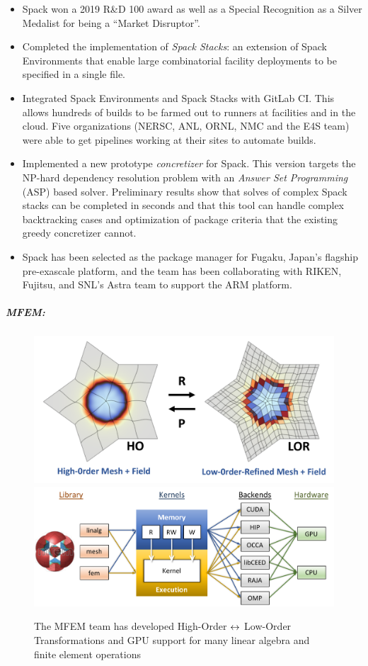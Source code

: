\begin{itemize}
\item Spack won a 2019 R\&D 100 award as well as a Special Recognition
      as a Silver Medalist for being a ``Market Disruptor''.

\item Completed the implementation of {\it Spack Stacks}: an extension of Spack
      Environments that enable large combinatorial facility deployments to
      be specified in a single file.

\item Integrated Spack Environments and Spack Stacks with GitLab CI.  This
      allows hundreds of builds to be farmed out to runners at facilities and
      in the cloud.  Five organizations (NERSC, ANL, ORNL, NMC and the E4S team)
      were able to get pipelines working at their sites to automate builds.

\item Implemented a new prototype {\it concretizer} for Spack.  This version
      targets the NP-hard dependency resolution problem with an {\it
      Answer Set Programming} (ASP) based solver.  Preliminary results
      show that solves of complex Spack stacks can be completed in
      seconds and that this tool can handle complex backtracking cases
      and optimization of package criteria that the existing greedy
      concretizer cannot.

\item Spack has been selected as the package manager for Fugaku, Japan's
      flagship pre-exascale platform, and the team has been collaborating
      with RIKEN, Fujitsu, and SNL's Astra team to support the ARM
      platform.
\end{itemize}

\subparagraph{MFEM:}

\begin{figure}[tb]
\centering
\includegraphics[width=.4\textwidth]{projects/2.3.6-NNSA/2.3.6.02-LLNL-ATDM/HO-LO}
\includegraphics[width=.4\textwidth]{projects/2.3.6-NNSA/2.3.6.02-LLNL-ATDM/mfem-gpu}
\caption{The MFEM team has developed High-Order $\protect\leftrightarrow$ Low-Order Transformations and GPU support for many linear algebra and finite element operations}
\end{figure}

